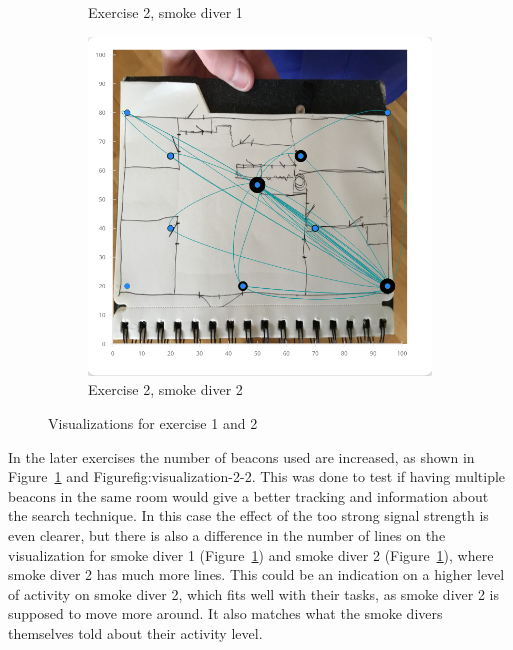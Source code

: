 \documentclass[../Main/thesis.tex]{subfiles}
\begin{document}
\begin{figure}[h]
\begin{subfigure}{0.3\textwidth}
		\caption{Exercise 2, smoke diver 1}
		\label{fig:visualization-2-1}
	\end{subfigure}
	\begin{subfigure}{0.3\textwidth}
		\includegraphics[width=\textwidth]{../fig/eval_2_fredrik}
		\caption{Exercise 2, smoke diver 2}
		\label{fig:visualization-2-2}
	\end{subfigure}
	\caption{Visualizations for exercise 1 and 2}
	\label{fig:eval-visualizations}
\end{figure}

In the later exercises the number of beacons used are increased, as shown in Figure~\ref{fig:visualization-2-1} and Figure{fig:visualization-2-2}.
This was done to test if having multiple beacons in the same room would give a better tracking and information about the search technique.
In this case the effect of the too strong signal strength is even clearer, but there is also a difference in the number of lines on the visualization for smoke diver 1 (Figure~\ref{fig:visualization-2-1}) and smoke diver 2 (Figure~\ref{fig:visualization-2-1}), where smoke diver 2 has much more lines.
This could be an indication on a higher level of activity on smoke diver 2, which fits well with their tasks, as smoke diver 2 is supposed to move more around.
It also matches what the smoke divers themselves told about their activity level.
\end{document}

